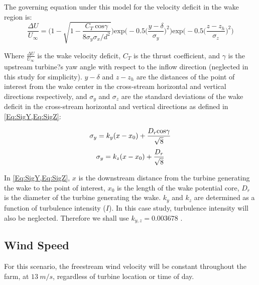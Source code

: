 \documentclass[12pt]{article}
\begin{document}
The governing equation under this model for the velocity deficit in the wake region is:
\begin{equation}
    \frac{\Delta U}{U_{\infty}}
    =
    \Bigg(
        1 - \sqrt{
            1 - \frac{C_T\ \text{cos}\gamma}
                {8\sigma_{y}\sigma_{x}/d^2}
            }
    \Bigg)
            \text{exp}\bigg(
                -0.5\Big(
                    \frac{y-\delta}{\sigma_{y}}
                \Big)^2
            \bigg)
            \text{exp}\bigg(
                -0.5\Big(
                    \frac{z-z_h}{\sigma_{z}}
                \Big)^2
            \bigg)
\end{equation}

Where $\frac{\Delta U}{U_{\infty}}$ is the wake velocity deficit, $C_T$ is the thrust coefficient, and $\gamma$ is the upstream turbine?s yaw angle with respect to the inflow direction (neglected in this study for simplicity). $y-\delta$ and $z-z_h$ are the distances of the point of interest from the wake center in the cross-stream horizontal and vertical directions respectively, and $\sigma_y$ and $\sigma_z$ are the standard deviations of the wake deficit in the cross-stream horizontal and vertical directions as defined in \cref{Eq:SigY,Eq:SigZ}:

\begin{equation}
    \sigma_y = k_y(x - x_0) + \frac{D_r \text{cos}\gamma}{\sqrt{8}} \\
    \label{Eq:SigY}
\end{equation}
\begin{equation}
    \label{Eq:SigZ}
    \sigma_y = k_z(x - x_0) + \frac{D_r}{\sqrt{8}}\\
\end{equation}

In \cref{Eq:SigY,Eq:SigZ}, $x$ is the downstream distance from the turbine generating the wake to the point of interest, $x_0$ is the length of the wake potential core, $D_r$ is the diameter of the turbine generating the wake. $k_y$ and $k_z$ are determined as a function of turbulence intensity ($I$). In this case study, turbulence intensity will also be neglected. Therefore we shall use $k_{y,z} = 0.003678$ \cite{Niayifar2016, Thomas2018}.

\subsection{Wind Speed}
    For this scenario, the freestream wind velocity will be constant throughout the farm, at $13\ m/s$, regardless of turbine location or time of day.
\end{document}
